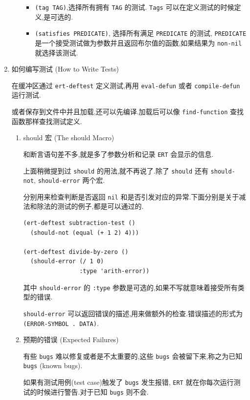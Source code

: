 \documentclass[11pt]{article}
\begin{document}
\begin{enumerate}
\begin{enumerate}
\begin{itemize}
\item \texttt{(tag TAG)},选择所有拥有 \texttt{TAG} 的测试. \texttt{Tags} 可以在定义测试的时候定义,是可选的.

\item \texttt{(satisfies PREDICATE)}, 选择所有满足 \texttt{PREDICATE} 的测试, \texttt{PREDICATE} 是一个接受测试做为参数并且返回布尔值的函数,如果结果为 \texttt{non-nil} 就选择该测试.
\end{itemize}
\end{enumerate}


\item 如何编写测试 (How to Write Tests)
\label{sec:orgee43ea0}

在缓冲区通过 \texttt{ert-deftest} 定义测试,再用 \texttt{eval-defun} 或者 \texttt{compile-defun} 运行测试.

或者保存到文件中并且加载,还可以先编译.加载后可以像 \texttt{find-function} 查找函数那样查找测试定义.


\begin{enumerate}
\item should 宏 (The should Macro)
\label{sec:orgdcaf604}

和断言语句差不多,就是多了参数分析和记录 \texttt{ERT} 会显示的信息.

上面稍微提到过 \texttt{should} 的用法,就不再说了.除了 \texttt{should} 还有 \texttt{should-not}, \texttt{should-error} 两个宏.

分别用来检查判断是否返回 \texttt{nil} 和是否引发对应的异常.下面分别是关于减法和除法的测试的例子,都是可以通过的.

\begin{verbatim}
(ert-deftest subtraction-test ()
  (should-not (equal (+ 1 2) 4)))

(ert-deftest divide-by-zero ()
  (should-error (/ 1 0)
                :type 'arith-error))
\end{verbatim}

其中 \texttt{should-error} 的 \texttt{:type} 参数是可选的,如果不写就意味着接受所有类型的错误.

\texttt{should-error} 可以返回错误的描述,用来做额外的检查.错误描述的形式为 \texttt{(ERROR-SYMBOL . DATA)}.


\item 预期的错误 (Expected Failures)
\label{sec:orgb489503}

有些 \texttt{bugs} 难以修复或者是不太重要的,这些 \texttt{bugs} 会被留下来,称之为已知 \texttt{bugs} (known bugs).

如果有测试用例(test case)触发了 \texttt{bugs} 发生报错, \texttt{ERT} 就在你每次运行测试的时候进行警告.对于已知 \texttt{bugs} 则不会.


\end{enumerate}
\end{enumerate}
\end{document}
